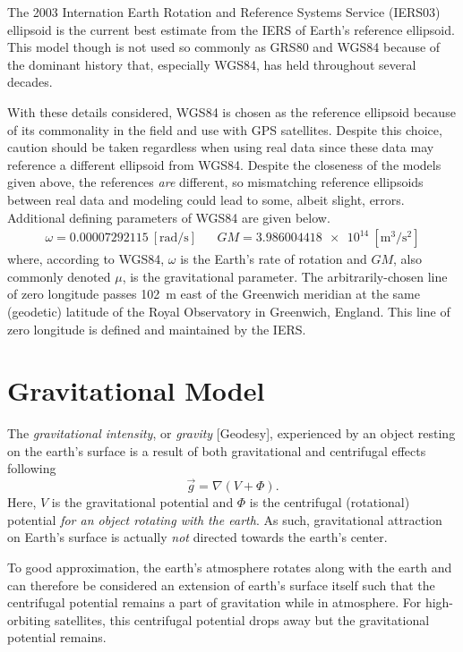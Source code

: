 \documentclass[11pt,dvipsnames]{thesis}
\begin{document}
The 2003 Internation Earth Rotation and Reference Systems Service (IERS03) ellipsoid is the current best estimate from the IERS of Earth's reference ellipsoid. This model though is not used so commonly as GRS80 and WGS84 because of the dominant history that, especially WGS84, has held throughout several decades.

With these details considered, WGS84 is chosen as the reference ellipsoid because of its commonality in the field and use with GPS satellites. Despite this choice, caution should be taken regardless when using real data since these data may reference a different ellipsoid from WGS84. Despite the closeness of the models given above, the references \textit{are} different, so mismatching reference ellipsoids between real data and modeling could lead to some, albeit slight, errors. Additional defining parameters of WGS84 are given below.
\begin{align}
\omega = \num{0.00007292115}\ [\si{\radian/\s}] && GM = \num{3.986004418e14}\ [\si{\m\cubed/\s\squared}]
\end{align}
where, according to WGS84, $\omega$ is the Earth's rate of rotation and $GM$, also commonly denoted $\mu$, is the gravitational parameter. The arbitrarily-chosen line of zero longitude passes \SI{102}{\m} east of the Greenwich meridian at the same (geodetic) latitude of the Royal Observatory in Greenwich, England. This line of zero longitude is defined and maintained by the IERS.



\section{Gravitational Model}
The \textit{gravitational intensity}, or \textit{gravity} [Geodesy], experienced by an object resting on the earth's surface is a result of both gravitational and centrifugal effects following
\begin{equation}
\vec{g} = \nabla (V + \Phi). \label{eq:GradientGravity}
\end{equation}
Here, $V$ is the gravitational potential and $\Phi$ is the centrifugal (rotational) potential \textit{for an object rotating with the earth}. As such, gravitational attraction on Earth's surface is actually \textit{not} directed towards the earth's center.

To good approximation, the earth's atmosphere rotates along with the earth and can therefore be considered an extension of earth's surface itself such that the centrifugal potential remains a part of gravitation while in atmosphere. For high-orbiting satellites, this centrifugal potential drops away but the gravitational potential remains.
\end{document}
